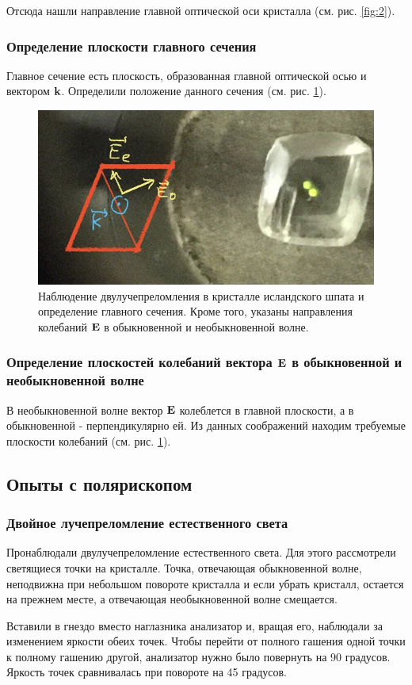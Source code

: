 \documentclass[12pt]{article}
\begin{document}
	Отсюда нашли направление главной оптической оси кристалла (см. рис. \ref{fig:2}).

	\subsubsection{Определение плоскости главного сечения}
	Главное сечение есть плоскость, образованная главной оптической осью и вектором $\vb{k}$. Определили положение данного сечения (см. рис. \ref{fig:3}).
	\begin{figure}[tb]
		\centering
		\includegraphics[width=1\linewidth]{../data/main_opt_pl}
		\caption{Наблюдение двулучепреломления в кристалле исландского шпата и определение главного сечения. Кроме того, указаны направления колебаний $\vb{E}$ в обыкновенной и необыкновенной волне.}
		\label{fig:3}
	\end{figure}

	\subsubsection{Определение плоскостей колебаний вектора $\vb{E}$ в обыкновенной и необыкновенной волне}
	В необыкновенной волне вектор $\vb{E}$ колеблется в главной плоскости, а в обыкновенной - перпендикулярно ей. Из данных соображений находим требуемые плоскости колебаний (см. рис. \ref{fig:3}).

	\subsection{Опыты с полярископом}
	\subsubsection{Двойное лучепреломление естественного света}
	Пронаблюдали двулучепреломление естественного света. Для этого рассмотрели светящиеся точки на кристалле. Точка, отвечающая обыкновенной волне, неподвижна при небольшом повороте кристалла и если убрать кристалл, остается на прежнем месте, а отвечающая необыкновенной волне смещается.
	\par Вставили в гнездо вместо наглазника анализатор и, вращая его, наблюдали за изменением яркости обеих точек. Чтобы перейти от полного гашения одной точки к полному гашению другой, анализатор нужно было повернуть на 90 градусов. Яркость точек сравнивалась при повороте на 45 градусов.
\end{document}
